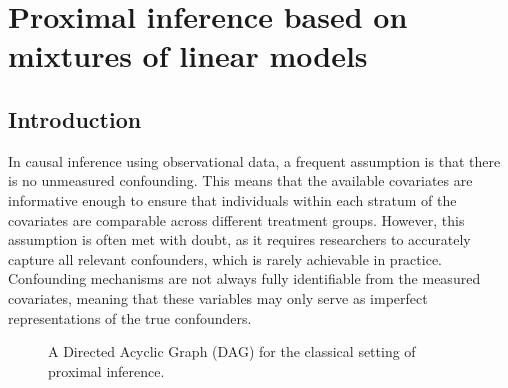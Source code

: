 
\chapter[Proximal inference based on mixtures of linear models]{Proximal inference based on mixtures of linear models}

\newcommand{\independent}{\protect\mathpalette{\protect\independenT}{\perp}}
\def\independenT#1#2{\mathrel{\rlap{$#1#2$}\mkern2mu{#1#2}}}

\section{Introduction}

In causal inference using observational data, a frequent assumption is that there is no unmeasured confounding. This means that the available covariates are informative enough to ensure that individuals within each stratum of the covariates are comparable across different treatment groups. However, this assumption is often met with doubt, as it requires researchers to accurately capture all relevant confounders, which is rarely achievable in practice. Confounding mechanisms are not always fully identifiable from the measured covariates, meaning that these variables may only serve as imperfect representations of the true confounders. 

\begin{figure}[H]
    \centering
{}
\caption{A Directed Acyclic Graph (DAG) for the classical setting of proximal inference.}
    \label{fig:figure1.0}
\end{figure}

